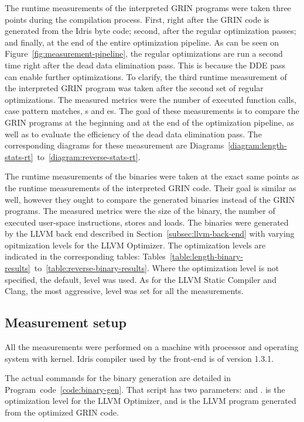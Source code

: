 \documentclass[main.tex]{subfiles}
\begin{document}
	The runtime measurements of the interpreted GRIN programs were taken three points during the compilation process. First, right after the GRIN code is generated from the Idris byte code; second, after the regular optimization passes; and finally, at the end of the entire optimization pipeline. As can be seen on Figure~\ref{fig:measurement-pipeline}, the regular optimizations are run a second time right after the dead data elimination pass. This is because the DDE pass can enable further optimizations. To clarify, the third runtime measurement of the interpreted GRIN program was taken after the second set of regular optimizations. The measured metrics were the number of executed function calls, case pattern matches, s and es. The goal of these measurements is to compare the GRIN programs at the beginning and at the end of the optimization pipeline, as well as to evaluate the efficiency of the dead data elimination pass. The corresponding diagrams for these measurement are Diagrams~\ref{diagram:length-stats-rt}~to~\ref{diagram:reverse-stats-rt}.

	The runtime measurements of the binaries were taken at the exact same points as the runtime measurements of the interpreted GRIN code. Their goal is similar as well, however they ought to compare the generated binaries instead of the GRIN programs. The measured metrics were the size of the binary, the number of executed user-space instructions, stores and loads. The binaries were generated by the LLVM back end described in Section~\ref{subsec:llvm-back-end} with varying opitmization levels for the LLVM Optimizer. The optimization levels are indicated in the corresponding tables: Tables~\ref{table:length-binary-results}~to~\ref{table:reverse-binary-results}. Where the optimization level is not specified, the default,  level was used. As for the LLVM Static Compiler and Clang, the most aggressive,  level was set for all the measurements.
	
	\subsection{Measurement setup}
	
	All the measurements were performed on a machine with  processor and  operating system with  kernel. Idris compiler used by the front-end is of version 1.3.1.
	
	The actual commands for the binary generation are detailed in Program~code~\ref{code:binary-gen}. That script has two parameters:  and .  is the optimization level for the LLVM Optimizer, and  is the LLVM program generated from the optimized GRIN code.
	
\end{document}
